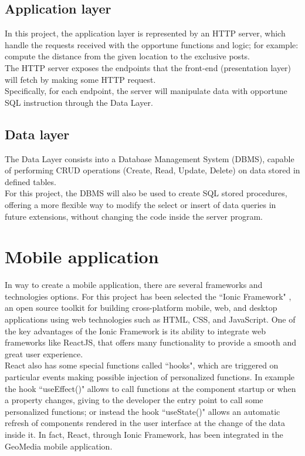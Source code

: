 \documentclass[conference]{IEEEtran}
\begin{document}
\subsection{Application layer}

In this project, the application layer is represented by an HTTP server, which handle the requests received with the opportune functions and logic; for example: compute the distance from the given location to the exclusive posts.
\\
The HTTP server exposes the endpoints that the front-end (presentation layer) will fetch by making some HTTP request.
\\
Specifically, for each endpoint, the server will manipulate data with opportune SQL instruction through the Data Layer.

\subsection{Data layer}

The Data Layer consists into a Database Management System (DBMS), capable of performing CRUD operations (Create, Read, Update, Delete) on data stored in defined tables.
\\
For this project, the DBMS will also be used to create SQL stored procedures, offering a more flexible way to modify the select or insert of data queries in future extensions, without changing the code inside the server program.


\section{Mobile application}
In way to create a mobile application, there are several frameworks and technologies options. For this project has been selected the ``Ionic Framework" \cite{b1}, an open source toolkit for building cross-platform mobile, web, and desktop applications using web technologies such as HTML, CSS, and JavaScript.
One of the key advantages of the Ionic Framework is its ability to integrate web frameworks like ReactJS, that offers many functionality to provide a smooth and great user experience.
\\
React also has some special functions called ``hooks", which are triggered on particular events making possible injection of personalized functions. In example the hook ``useEffect()" allows to call functions at the component startup or when a property changes, giving to the developer the entry point to call some personalized functions; or instead the hook ``useState()" allows an automatic refresh of components rendered in the user interface at the change of the data inside it.
In fact, React, through Ionic Framework, has been integrated in the GeoMedia mobile application.
\end{document}
